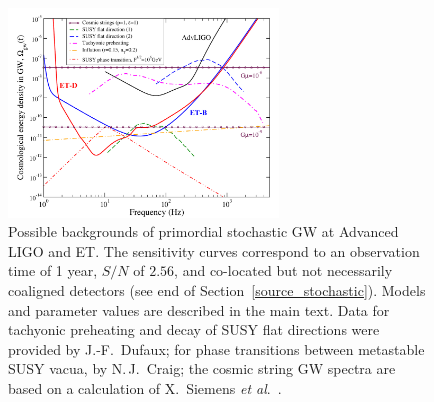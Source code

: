 %
\begin{figure}[p]
\centering
\vskip -0.2cm
\includegraphics[width=0.64\textwidth]{./Sec_ET_ScienceCase/landscape_DSD}
\caption{Possible backgrounds of primordial stochastic GW at Advanced LIGO and ET.
The sensitivity curves correspond to an observation time of 1 year, $S/N$ of $2.56$, and co-located but not necessarily coaligned detectors (see end of Section~\ref{source_stochastic}). 
Models and parameter values are described in the main text. Data for tachyonic preheating and decay of SUSY flat directions were provided by J.-F.~Dufaux; for phase transitions between metastable SUSY vacua, by N.\,J.~Craig; the cosmic string GW spectra are based on a calculation of X.~Siemens {\it et al}.\ \cite{Siemens:2006yp}.
}
\label{fig:cosmo_stochastic}
\end{figure}

